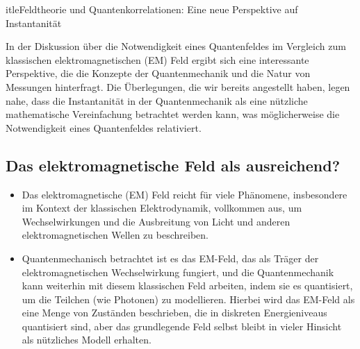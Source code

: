 \documentclass[12pt,a4paper]{article}
\begin{document}
	
	
		itle{Feldtheorie und Quantenkorrelationen: Eine neue Perspektive auf Instantanität}
	
	
	\maketitle
	
	In der Diskussion über die Notwendigkeit eines Quantenfeldes im Vergleich zum klassischen elektromagnetischen (EM) Feld ergibt sich eine interessante Perspektive, die die Konzepte der Quantenmechanik und die Natur von Messungen hinterfragt. Die Überlegungen, die wir bereits angestellt haben, legen nahe, dass die Instantanität in der Quantenmechanik als eine nützliche mathematische Vereinfachung betrachtet werden kann, was möglicherweise die Notwendigkeit eines Quantenfeldes relativiert.
	
	\subsection{Das elektromagnetische Feld als ausreichend?}
	\begin{itemize}
		\item Das elektromagnetische (EM) Feld reicht für viele Phänomene, insbesondere im Kontext der klassischen Elektrodynamik, vollkommen aus, um Wechselwirkungen und die Ausbreitung von Licht und anderen elektromagnetischen Wellen zu beschreiben.
		\item Quantenmechanisch betrachtet ist es das EM-Feld, das als Träger der elektromagnetischen Wechselwirkung fungiert, und die Quantenmechanik kann weiterhin mit diesem klassischen Feld arbeiten, indem sie es quantisiert, um die Teilchen (wie Photonen) zu modellieren. Hierbei wird das EM-Feld als eine Menge von Zuständen beschrieben, die in diskreten Energieniveaus quantisiert sind, aber das grundlegende Feld selbst bleibt in vieler Hinsicht als nützliches Modell erhalten.
	\end{itemize}
	
\end{document}
